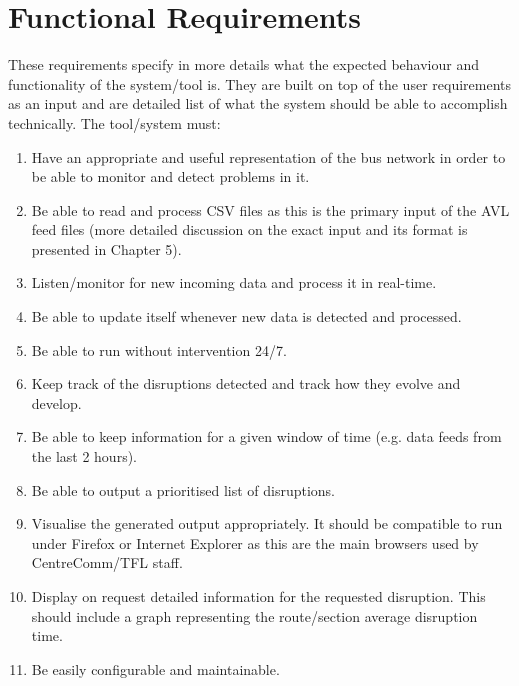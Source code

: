 \section{Functional Requirements}
These requirements specify in more details what the expected behaviour and functionality of the system/tool is. They are built on top of the user requirements as an input and are detailed list of what the system should be able to accomplish technically. The tool/system must:
\begin{enumerate}
	\item Have an appropriate and useful representation of the bus network in order to be able to monitor and detect problems in it.
	\item Be able to read and process CSV files as this is the primary input of the AVL feed files (more detailed discussion on the exact input and its format is presented in Chapter 5).
	\item Listen/monitor for new incoming data and process it in real-time.
	\item Be able to update itself whenever new data is detected and processed.
	\item Be able to run without intervention 24/7.
	\item Keep track of the disruptions detected and track how they evolve and develop.
	\item Be able to keep information for a given window of time (e.g. data feeds from the last 2 hours).
	\item Be able to output a prioritised list of disruptions.
	\item Visualise the generated output appropriately. It should be compatible to run under Firefox or Internet Explorer as this are the main browsers used by CentreComm/TFL staff.
	\item Display on request detailed information for the requested disruption. This should include a graph representing the route/section average disruption time.
	\item Be easily configurable and maintainable.
\end{enumerate}